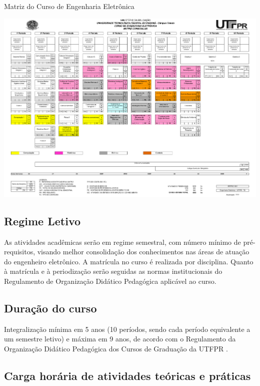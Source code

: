 \begin{landscape}
	\begin{quadro}
		\centering
		\caption{Matriz do Curso de Engenharia Eletrônica}
		\includegraphics[width=1.2\textwidth]{Caps/Figs/NovaMatriz.pdf}
		\fonte{\utf}
		\label{qua:matriz}
	\end{quadro}
\end{landscape}

\subsection{Regime Letivo}
\label{sub:reg}

As atividades acadêmicas serão em regime semestral, com número mínimo de pré-requisitos, visando melhor consolidação dos conhecimentos nas áreas de atuação do engenheiro eletrônico. A matrícula no curso é realizada por disciplina. Quanto à matrícula e à periodização serão seguidas as normas institucionais do Regulamento de Organização Didático Pedagógica aplicável ao curso.

\subsection{Duração do curso}

Integralização mínima em 5 anos (10 períodos, sendo cada período equivalente a um semestre letivo) e máxima em 9 anos, de acordo com o Regulamento da Organização Didático Pedagógica dos Cursos de Graduação da UTFPR \cite{rodp}.

\subsection{Carga horária de atividades teóricas e práticas}

